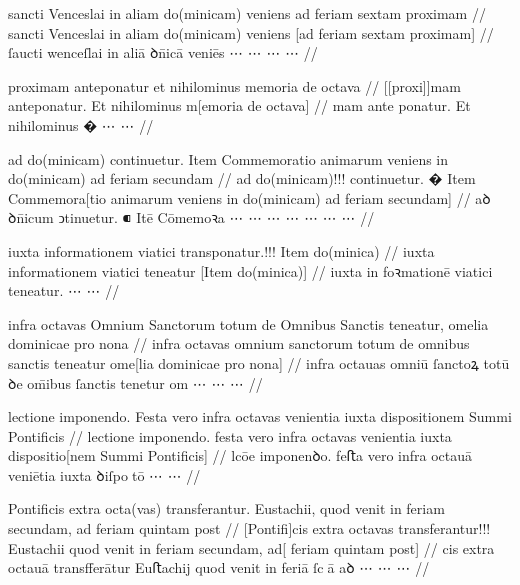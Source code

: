 \ex \bg
\gla
{}
sancti Venceslai in aliam do(minicam) veniens ad feriam sextam proximam
//
\glRekonstrukcja
{}
sancti Venceslai in aliam do(minicam) veniens [ad feriam sextam proximam]
//
\glU
{}
ſaucti wenceſlai in aliā ꝺn̄icā veniēs ⋯ ⋯ ⋯ ⋯
//
\endgl
\xe



\ex \bg
\gla
{}
proximam anteponatur et nihilominus memoria de octava
//
\glRekonstrukcja
{}
[[proxi]]mam anteponatur. Et nihilominus m[emoria de octava]
//
\glU
{}
mam {ante ponatur}. Et nihilominus � ⋯ ⋯
//
\endgl
\xe



\ex \bg
\gla
{}
ad do(minicam) continuetur.
{} Item Commemoratio animarum veniens in do(minicam) ad feriam
secundam 
//
\glRekonstrukcja
{}
ad do(minicam)!!! continuetur.
� Item Commemora[tio animarum veniens in do(minicam) ad feriam
secundam] 
//
\glU
{}
aꝺ ꝺn̄icum ↄtinuetur. ⁌ Itē Cōmemoꝛa ⋯ ⋯ ⋯ ⋯ ⋯ ⋯ ⋯
//
\endgl
\xe



\ex \bg
\gla
{}
iuxta informationem viatici transponatur.!!! {}
Item do(minica)
//
\glRekonstrukcja
{}
iuxta informationem viatici {} teneatur
[Item do(minica)]
//
\glU
{}
iuxta {in foꝛmationē} viatici {} teneatur. ⋯ ⋯
//
\endgl
\xe


\ex \bg
\gla
{}
infra octavas Omnium Sanctorum totum de Omnibus Sanctis teneatur, omelia dominicae pro nona
//
\glRekonstrukcja
{}
infra octavas omnium sanctorum totum de omnibus sanctis teneatur ome[lia dominicae pro nona]
//
\glU
{}
infra octauas omniū ſanctoꝝ totū ꝺe om̄ibus ſanctis tenetur om ⋯ ⋯ ⋯
//
\endgl
\xe



\ex \bg
\gla
{}
lectione imponendo.
Festa vero infra octavas venientia iuxta dispositionem Summi
Pontificis
//
\glRekonstrukcja
{}
lectione imponendo.
festa vero infra octavas venientia iuxta dispositio[nem Summi
Pontificis]
//
\glU
{}
lcōe imponenꝺo. feﬅa vero infra octauā veniētia iuxta ꝺiſpotō ⋯ ⋯
//
\endgl
\xe



\ex \bg
\gla
{}
Pontificis extra octa(vas) transferantur.
Eustachii, quod venit in feriam secundam, ad feriam quintam
post 
//
\glRekonstrukcja
{}
[Pontifi]cis extra octavas transferantur!!!
Eustachii quod venit in feriam secundam, ad[ feriam quintam
post] 
//
\glU
{}
cis extra octauā transfferātur Euﬅachij quod venit in feriā ſcā aꝺ ⋯ ⋯ ⋯
//
\endgl
\xe



